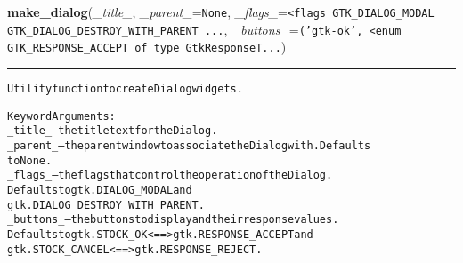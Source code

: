     \label{reliafree:widgets:make_dialog}

    \vspace{0.5ex}

\hspace{.8\funcindent}\begin{boxedminipage}{\funcwidth}

    \raggedright \textbf{make\_dialog}(\textit{\_title\_}, \textit{\_parent\_}={\tt None}, \textit{\_flags\_}={\tt {\textless}flags GTK\_DIALOG\_MODAL {\textbar} GTK\_DIALOG\_DESTROY\_WITH\_PARENT \texttt{...}}, \textit{\_buttons\_}={\tt \texttt{(}\texttt{'}\texttt{gtk-ok}\texttt{'}\texttt{, }{\textless}enum GTK\_RESPONSE\_ACCEPT of type GtkResponseT\texttt{...}})

    \vspace{-1.5ex}

    \rule{\textwidth}{0.5\fboxrule}
\setlength{\parskip}{2ex}
\begin{alltt}
Utility function to create Dialog widgets.

Keyword Arguments:
\_title\_   -- the title text for the Dialog.
\_parent\_  -- the parent window to associate the Dialog with.  Defaults
             to None.
\_flags\_   -- the flags that control the operation of the Dialog.
             Defaults to gtk.DIALOG\_MODAL and
             gtk.DIALOG\_DESTROY\_WITH\_PARENT.
\_buttons\_ -- the buttons to display and their response values.
             Defaults to gtk.STOCK\_OK {\textless}=={\textgreater} gtk.RESPONSE\_ACCEPT and
             gtk.STOCK\_CANCEL {\textless}=={\textgreater} gtk.RESPONSE\_REJECT.
\end{alltt}

\setlength{\parskip}{1ex}
    \end{boxedminipage}

    \label{reliafree:widgets:make_entry}

    \vspace{0.5ex}

